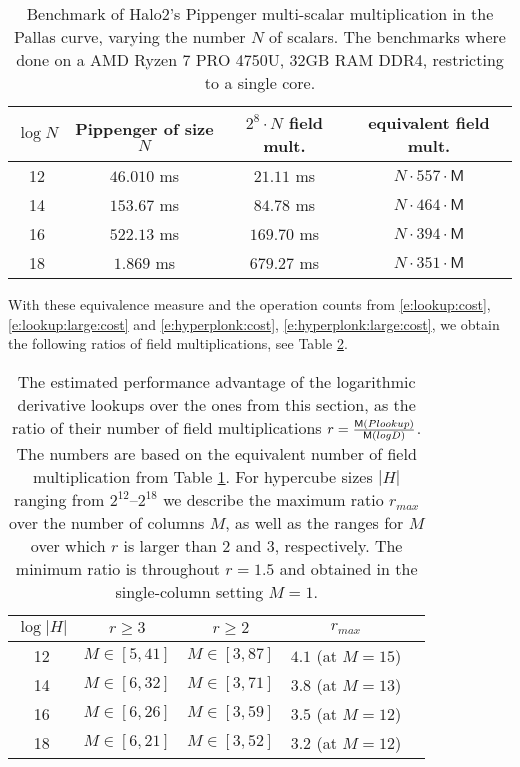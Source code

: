 \documentclass[11pt]{article}
\theoremstyle{definition}
\theoremstyle{remark}
\begin{document}
\begin{table}[h!]
\caption{%
Benchmark of Halo2's Pippenger multi-scalar multiplication in the Pallas curve, varying the number $N$ of scalars.
The benchmarks where done on a AMD Ryzen 7 PRO 4750U, 32GB RAM DDR4,  restricting to a single core.
}
\label{tab:pippenger}
\begin{center}
\begin{tabular}{|c|c|c|c|}
\hline
$\log N$ &  Pippenger of size $N$ & $2^8\cdot N$ field mult. & equivalent field mult.
\\\hline
12 & $46.010$ ms &  $21.11$ ms & $N\cdot 557\cdot \mathsf M$
\\
14 & $153.67$ ms & $84.78$ ms & $N\cdot 464 \cdot \mathsf M$
\\
16 & $522.13$ ms & $169.70$ ms & $N\cdot 394\cdot\mathsf M$
\\
18 &       $1.869$  ms  & $679.27$ ms & $N\cdot 351\cdot\mathsf M$
\\\hline
\end{tabular}
\end{center}
\end{table}

With these equivalence measure and the operation counts from  \eqref{e:lookup:cost}, \eqref{e:lookup:large:cost} and \eqref{e:hyperplonk:cost}, \eqref{e:hyperplonk:large:cost}, we obtain the following ratios of field multiplications, see Table \ref{tab:comparison}.

\begin{table}[h!]
\caption{%
The estimated performance advantage of the logarithmic derivative lookups over the ones from this section, as the ratio of their number of field multiplications $r =\nicefrac{\mathsf M({Plookup})}{\mathsf M({logD})}$.
The numbers are based on the equivalent number of field multiplication from Table \ref{tab:pippenger}.
For hypercube sizes $|H|$ ranging from $2^{12}$--$2^{18}$ we describe the maximum ratio $r_{max}$ over the number of columns $M$, as well as the ranges for $M$ over which $r$ is larger than $2$ and $3$, respectively.
The minimum ratio is throughout $r= 1.5$ and obtained in the single-column setting $M=1$. 
}
\label{tab:comparison}
\vspace*{0.5cm}
\centering
\begin{tabular} {|c|c|c|c|c|}
\hline
$\log|H|$ & $r\geq 3$ & $r\geq 2$ & $r_{max}$ 
\\\hline
12 & $M\in [5, 41]$ & $M\in [3, 87]$ & $4.1$ (at $M =15$)
\\
14 & $M\in [6, 32]$ & $M\in [3, 71]$ & $3.8$ (at $M= 13$)
\\
16 & $M\in [6, 26]$  & $M\in [3, 59]$ & $3.5$ (at $M= 12$)
\\
18 & $M\in [6, 21]$  & $M\in [3, 52]$ & $3.2$ (at $M= 12$)
\\\hline
\end{tabular}
\end{table}
\end{document}
